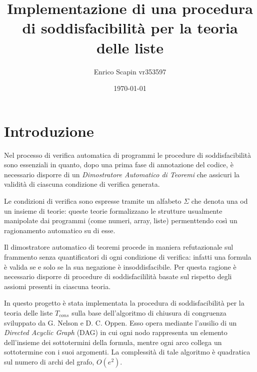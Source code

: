 \documentclass[a4paper,11pt]{article}
\title{\bf{Implementazione di una procedura di soddisfacibilità per la teoria delle liste}}
\author{Enrico Scapin vr353597}
\date{\today}
\begin{document}
\maketitle

\small
\section{Introduzione}
Nel processo di verifica automatica di programmi le 
procedure di soddisfacibilità sono essenziali in quanto, dopo una prima fase di 
annotazione del codice, è necessario disporre di un \emph{Dimostratore 
Automatico di Teoremi} che assicuri la validità di ciascuna condizione 
di verifica generata.\par
Le condizioni di verifica sono espresse tramite un alfabeto $\Sigma$ che 
denota una od un insieme di teorie: queste teorie formalizzano le strutture 
usualmente manipolate dai programmi (come numeri, array, liste) 
permenttendo così un ragionamento automatico su di esse.\par
Il dimostratore automatico di teoremi procede in maniera refutazionale sul 
frammento senza quantificatori di ogni condizione di verifica: infatti 
una formula è valida se e solo se la sua negazione è insoddisfacibile.
Per questa ragione è necessario disporre di procedure di soddisfacililità 
basate sul rispetto degli assiomi presenti in ciascuna teoria.\par
In questo progetto è stata implementata la procedura di 
soddisfacibilità per la teoria delle liste $T_{cons}$ sulla base 
dell'algoritmo di chiusura di congruenza sviluppato da G. Nelson e D. C. Oppen.
Esso opera mediante l'ausilio di un \emph{Directed Acyclic Graph} (DAG) in cui 
ogni nodo rappresenta un elemento dell'insieme dei sottotermini della 
formula, mentre ogni arco collega un sottotermine con i suoi argomenti.
La complessità di tale algoritmo è quadratica sul numero di archi del 
grafo, $O(e^2)$.

\end{document}
